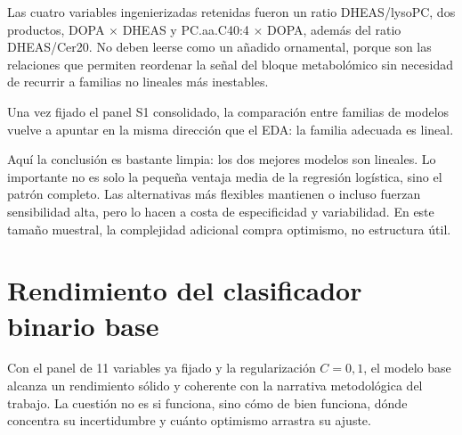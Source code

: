Las cuatro variables ingenierizadas retenidas fueron un ratio DHEAS/lysoPC, dos productos, DOPA $\times$ DHEAS y
PC.aa.C40:4 $\times$ DOPA, además del ratio DHEAS/Cer20. No deben leerse como un añadido ornamental, porque son las
relaciones que permiten reordenar la señal del bloque metabolómico sin necesidad de recurrir a familias no lineales más
inestables.

Una vez fijado el panel S1 consolidado, la comparación entre familias de modelos vuelve a apuntar en la misma dirección que el EDA: la familia adecuada es lineal.

\begin{table}[ht]
\centering
\caption{Benchmark de algoritmos sobre el panel consolidado de 11 variables, reevaluado mediante 200 holdouts estratificados 80/20.}
\label{tab:model_benchmark_results}
\small
\setlength{\tabcolsep}{4pt}
\end{table}

Aquí la conclusión es bastante limpia: los dos mejores modelos son lineales. Lo importante no es solo la pequeña
ventaja media de la regresión logística, sino el patrón completo. Las alternativas más flexibles mantienen o incluso
fuerzan sensibilidad alta, pero lo hacen a costa de especificidad y variabilidad. En este tamaño muestral, la
complejidad adicional compra optimismo, no estructura útil.

\section{Rendimiento del clasificador binario base}\label{sec:rendimiento}

Con el panel de 11 variables ya fijado y la regularización $C=0{,}1$, el modelo base alcanza un rendimiento sólido y coherente con la narrativa metodológica del trabajo. La cuestión no es si funciona, sino cómo de bien funciona, dónde concentra su incertidumbre y cuánto optimismo arrastra su ajuste.

